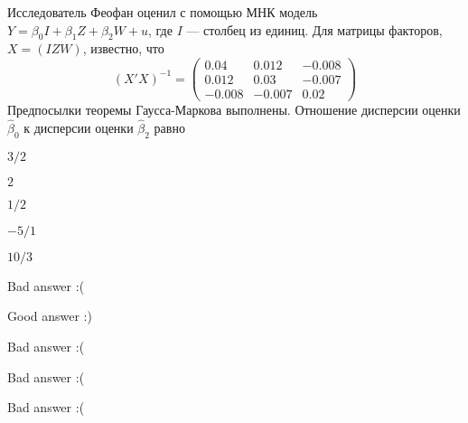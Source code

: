 
\begin{question}
Исследователь Феофан оценил с помощью МНК модель \(Y = \beta_0 I + \beta_1 Z + \beta_2 W + u\), где \(I\) --- столбец из единиц.
Для матрицы факторов, \(X = (I Z W)\), известно, что
\[
(X'X)^{-1} = \begin{pmatrix}
0.04 & 0.012 & -0.008 \\
0.012 & 0.03 & -0.007 \\
-0.008 & -0.007 & 0.02 
\end{pmatrix}
\]
Предпосылки теоремы Гаусса-Маркова выполнены. Отношение дисперсии оценки \(\hat \beta_0\) к дисперсии оценки \(\hat \beta_2\) равно
\begin{answerlist}
  \item \(3/2\)
  \item \(2\)
  \item \(1/2\)
  \item \(-5/1\)
  \item \(10/3\)
\end{answerlist}
\end{question}

\begin{solution}
\begin{answerlist}
  \item Bad answer :(
  \item Good answer :)
  \item Bad answer :(
  \item Bad answer :(
  \item Bad answer :(
\end{answerlist}
\end{solution}

